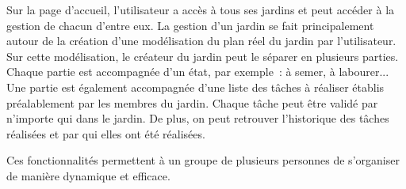 \documentclass[french,a4paper]{article}
\begin{document}
Sur la page d'accueil, l'utilisateur a accès à tous ses jardins et peut accéder à la gestion de chacun d'entre eux. La gestion d'un jardin se fait principalement autour de la création d'une modélisation du plan réel du jardin par l'utilisateur. Sur cette modélisation, le créateur du jardin peut le séparer en plusieurs parties. Chaque partie est accompagnée d'un état, par exemple~: à semer, à labourer... Une partie est également accompagnée d'une liste des tâches à réaliser établis préalablement par les membres du jardin. Chaque tâche peut être validé par n'importe qui dans le jardin. De plus, on peut retrouver l'historique des tâches réalisées et par qui elles ont été réalisées.

Ces fonctionnalités permettent à un groupe de plusieurs personnes de s'organiser de manière dynamique et efficace.
\end{document}
